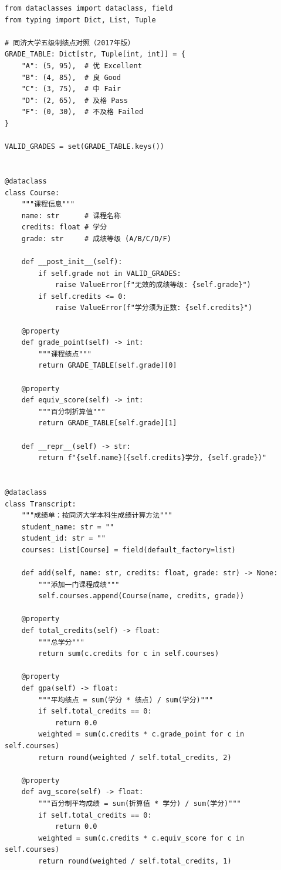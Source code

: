 \makeatletter
\begin{longlisting}
\iftongjithesis@minted
\begin{verbatim}
from dataclasses import dataclass, field
from typing import Dict, List, Tuple

# 同济大学五级制绩点对照（2017年版）
GRADE_TABLE: Dict[str, Tuple[int, int]] = {
    "A": (5, 95),  # 优 Excellent
    "B": (4, 85),  # 良 Good
    "C": (3, 75),  # 中 Fair
    "D": (2, 65),  # 及格 Pass
    "F": (0, 30),  # 不及格 Failed
}

VALID_GRADES = set(GRADE_TABLE.keys())


@dataclass
class Course:
    """课程信息"""
    name: str      # 课程名称
    credits: float # 学分
    grade: str     # 成绩等级 (A/B/C/D/F)

    def __post_init__(self):
        if self.grade not in VALID_GRADES:
            raise ValueError(f"无效的成绩等级: {self.grade}")
        if self.credits <= 0:
            raise ValueError(f"学分须为正数: {self.credits}")

    @property
    def grade_point(self) -> int:
        """课程绩点"""
        return GRADE_TABLE[self.grade][0]

    @property
    def equiv_score(self) -> int:
        """百分制折算值"""
        return GRADE_TABLE[self.grade][1]

    def __repr__(self) -> str:
        return f"{self.name}({self.credits}学分, {self.grade})"


@dataclass
class Transcript:
    """成绩单：按同济大学本科生成绩计算方法"""
    student_name: str = ""
    student_id: str = ""
    courses: List[Course] = field(default_factory=list)

    def add(self, name: str, credits: float, grade: str) -> None:
        """添加一门课程成绩"""
        self.courses.append(Course(name, credits, grade))

    @property
    def total_credits(self) -> float:
        """总学分"""
        return sum(c.credits for c in self.courses)

    @property
    def gpa(self) -> float:
        """平均绩点 = sum(学分 * 绩点) / sum(学分)"""
        if self.total_credits == 0:
            return 0.0
        weighted = sum(c.credits * c.grade_point for c in self.courses)
        return round(weighted / self.total_credits, 2)

    @property
    def avg_score(self) -> float:
        """百分制平均成绩 = sum(折算值 * 学分) / sum(学分)"""
        if self.total_credits == 0:
            return 0.0
        weighted = sum(c.credits * c.equiv_score for c in self.courses)
        return round(weighted / self.total_credits, 1)


\end{verbatim}
\end{longlisting}
